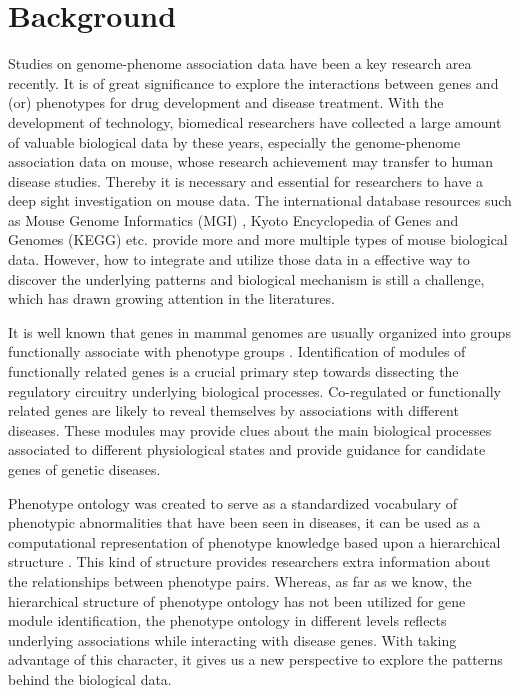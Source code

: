 \documentclass{bmcart}
\begin{document}
\section*{Background}
Studies on genome-phenome association data have been a key research area recently. It is of great significance to explore the interactions between genes and (or) phenotypes for drug development and disease treatment. With the development of technology, biomedical researchers have collected a large amount of valuable biological data by these years, especially the genome-phenome association data on mouse, whose research achievement may transfer to human disease studies. Thereby it is necessary and essential for researchers to have a deep sight investigation on mouse data. The international database resources such as Mouse Genome Informatics (MGI) \cite{Eppig2015}, Kyoto Encyclopedia of Genes and Genomes (KEGG) \cite{Kanehisa2000} etc. provide more and more multiple types of mouse biological data. However, how to integrate and utilize those data in a effective way to discover the underlying patterns and biological mechanism is still a challenge, which has drawn growing attention in the literatures.

It is well known that genes in mammal genomes are usually organized into groups functionally associate with phenotype groups \cite{XuanH2015,Lage2007}. Identification of modules of functionally related genes is a crucial primary step towards dissecting the regulatory circuitry underlying biological processes. Co-regulated or functionally related genes are likely to reveal themselves by associations with different diseases. These modules may provide clues about the main biological processes associated to different physiological states and provide guidance for candidate genes of genetic diseases.


Phenotype ontology was created to serve as a standardized vocabulary of phenotypic abnormalities that have been seen in diseases, it can be used as a computational representation of phenotype knowledge based upon a hierarchical structure \cite{Robinson2014,Kohler2014}. This kind of structure provides researchers extra information about the relationships between phenotype pairs. Whereas, as far as we know, the hierarchical structure of phenotype ontology has not been utilized for gene module identification, the phenotype ontology in different levels reflects underlying associations while interacting with disease genes. With taking advantage of this character, it gives us a new perspective to explore the patterns behind the biological data.
\end{document}
